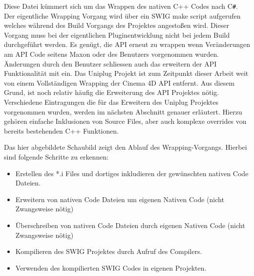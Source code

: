 \documentclass[pagesize, paper=a4, fontsize=12pt, titlepage=true, headings=small, headnosepline, abstractoff, liststotoc, nochapterprefix, plainheadsepline, twoside]{scrreprt}
\newcommand{\CS}{C\texttt{\#}}
\begin{document}
Diese Datei kümmert sich um das Wrappen des nativen C++ Codes nach \CS. Der eigentliche Wrapping Vorgang wird über ein SWIG make script aufgerufen welches während des Build Vorgangs des Projektes angestoßen wird. Dieser Vorgang muss bei der eigentlichen Pluginentwicklung nicht bei jedem Build durchgeführt werden. Es genügt, die API erneut zu wrappen wenn Veränderungen am API Code seitens Maxon oder des Benutzers vorgenommen wurden. Änderungen durch den Benutzer schliessen auch das erweitern der API Funktionalität mit ein. Das Uniplug Projekt ist zum Zeitpunkt dieser Arbeit weit von einem Vollständigen Wrapping der Cinema 4D API entfernt. Aus diesem Grund, ist noch relativ häufig die Erweiterung des API Projektes nötig. Verschiedene Eintragungen die für das Erweitern des Uniplug Projektes vorgenommen wurden, werden im nächsten Abschnitt genauer erläutert. Hierzu gehören einfache Inklusionen von Source Files, aber auch komplexe overrides von bereits bestehenden C++ Funktionen.

Das hier abgebildete Schaubild zeigt den Ablauf des Wrapping-Vorgangs. Hierbei sind folgende Schritte zu erkennen:
\begin{itemize}
\item Erstellen des *.i Files und dortiges inkludieren der gewünschten nativen Code Dateien.
\item Erweitern von nativen Code Dateien um eigenen Nativen Code (nicht Zwangsweise nötig)
\item Überschreiben von nativen Code Dateien durch eigenen Nativen Code (nicht Zwangsweise nötig)
\item Kompilieren des SWIG Projektes durch Aufruf des Compilers.
\item Verwenden des kompilierten SWIG Codes in eigenen Projekten.
\end{itemize}
\end{document}
